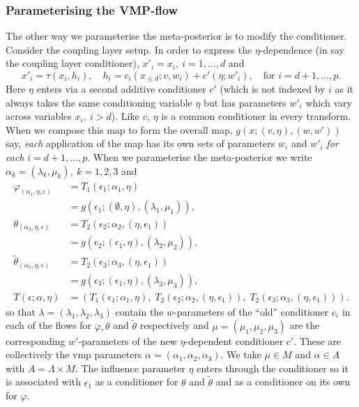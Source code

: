 \subsubsection{Parameterising the VMP-flow}
The other way we parameterise the meta-posterior is to modify the conditioner. Consider the coupling layer setup. In order to express the $\eta$-dependence (in say the coupling layer conditioner), $x'_i=x_i,\ i=1,...,d$ and
\[
x'_i=\tau(x_i,h_i), \quad h_i=c_i(x_{\le d};v,w_i)+c'(\eta;w'_i),\quad \mbox{for $i=d+1,...,p$}.
\]
Here $\eta$ enters via a second additive conditioner $c'$ (which is not indexed by $i$ as it always takes the same conditioning variable $\eta$ but has parameters $w'_i$ which vary across variables $x_i,\ i>d$). Like $v$, $\eta$ is a common conditioner in every transform. When we compose this map 
to form the overall map, $g(x;(v,\eta),(w,w'))$ say, \emph{each} application of the map has its own sets of parameters $w_i$ and $w'_i$ \emph{for each} $i=d+1,...,p$. When we parameterise the meta-posterior we write $\alpha_k=(\lambda_k,\mu_k),\ k=1,2,3$ and
\begin{align}
    \varphi_{(\alpha_1,\eta,\epsilon)}&=T_1(\epsilon_1;\alpha_1,\eta)\nonumber\\
    &=g(\epsilon_1;(\emptyset,\eta),(\lambda_1,\mu_1)),\label{eq:meta_new_map_phi}\\
    \theta_{(\alpha_2,\eta,\epsilon)}&=T_2(\epsilon_2;\alpha_2, (\eta,\epsilon_1))\nonumber\\
    &=g(\epsilon_2;(\epsilon_1,\eta),(\lambda_2,\mu_2)),\label{eq:meta_new_map_theta}\\
    \tilde\theta_{(\alpha_3,\eta,\epsilon)}&=T_2(\epsilon_3;\alpha_3,(\eta,\epsilon_1))\nonumber\\
    &=g(\epsilon_3;(\epsilon_1,\eta),(\lambda_3,\mu_3)),\label{eq:meta_new_map_theta_tilde}\\
    T(\epsilon;\alpha,\eta) & = \left( T_1(\epsilon_1;\alpha_1,\eta) ,\; T_2(\epsilon_2;\alpha_2, (\eta,\epsilon_1)) ,\; T_2(\epsilon_3;\alpha_3,(\eta,\epsilon_1)) \right).
\end{align}
so that $\lambda=(\lambda_1,\lambda_2,\lambda_3)$ contain the $w$-parameters of the ``old'' conditioner $c_i$ in each of the flows for $\varphi,\theta$ and $\tilde\theta$ respectively and $\mu=(\mu_1,\mu_2,\mu_3)$ are the corresponding $w'$-parameters of the new $\eta$-dependent conditioner $c'$. These are collectively  the \acrshort{vmp} parameters $\alpha=(\alpha_1,\alpha_2,\alpha_3)$.
We take $\mu\in M$ and $\alpha\in A$ with $A=\Lambda\times M$. The influence parameter $\eta$ enters through the conditioner so it is associated with $\epsilon_1$ as a conditioner for $\theta$ and $\tilde\theta$ and as a conditioner on its own for $\varphi$.

